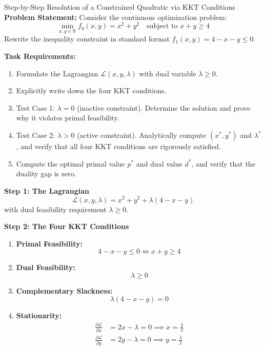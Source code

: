 \begin{examplebox}[breakable]{Step-by-Step Resolution of a Constrained Quadratic via KKT Conditions}
\textbf{Problem Statement:}
Consider the continuous optimization problem:
\begin{equation}
\min_{x, y \in \mathbb{R}} f_0(x, y) = x^2 + y^2 \quad \text{subject to } x + y \ge 4
\end{equation}
Rewrite the inequality constraint in standard format $f_1(x, y) = 4 - x - y \le 0$.

\textbf{Task Requirements:}
\begin{enumerate}
    \item Formulate the Lagrangian $\mathcal{L}(x, y, \lambda)$ with dual variable $\lambda \ge 0$.
    \item Explicitly write down the four KKT conditions.
    \item Test Case 1: $\lambda = 0$ (inactive constraint). Determine the solution and prove why it violates primal feasibility.
    \item Test Case 2: $\lambda > 0$ (active constraint). Analytically compute $(x^*, y^*)$ and $\lambda^*$, and verify that all four KKT conditions are rigorously satisfied.
    \item Compute the optimal primal value $p^*$ and dual value $d^*$, and verify that the duality gap is zero.
\end{enumerate}

\tcblower

\textbf{Step 1: The Lagrangian}
\begin{equation}
\mathcal{L}(x, y, \lambda) = x^2 + y^2 + \lambda(4 - x - y)
\end{equation}
with dual feasibility requirement $\lambda \ge 0$.

\textbf{Step 2: The Four KKT Conditions}
\begin{enumerate}
    \item \textbf{Primal Feasibility:}
    \begin{equation}
    4 - x - y \le 0 \iff x + y \ge 4
    \label{eq:ex_kkt_primal}
    \end{equation}
    \item \textbf{Dual Feasibility:}
    \begin{equation}
    \lambda \ge 0
    \label{eq:ex_kkt_dual}
    \end{equation}
    \item \textbf{Complementary Slackness:}
    \begin{equation}
    \lambda(4 - x - y) = 0
    \label{eq:ex_kkt_slack}
    \end{equation}
    \item \textbf{Stationarity:}
    \begin{align}
    \frac{\partial \mathcal{L}}{\partial x} &= 2x - \lambda = 0 \implies x = \frac{\lambda}{2} \label{eq:ex_kkt_stat_x} \\
    \frac{\partial \mathcal{L}}{\partial y} &= 2y - \lambda = 0 \implies y = \frac{\lambda}{2} \label{eq:ex_kkt_stat_y}
    \end{align}
\end{enumerate}


\end{examplebox}
